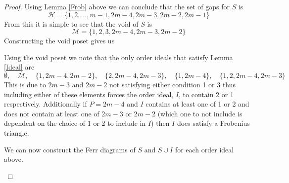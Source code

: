 \documentclass[11pt,letterpaper]{article}
\theoremstyle{definition}
\begin{document}
\begin{proof}
    Using Lemma \ref{Frob} above we can conclude that the set of gaps for $S$ is 
    \[\mathcal{H}=\{1,2,...,m-1,2m-4,2m-3,2m-2,2m-1\}\]
    From this it is simple to see that the void of $S$ is 
    \[\mathcal{M}=\{1,2,3,2m-4,2m-3,2m-2\}\]
    Constructing the void poset gives us 
    \begin{center}
    \end{center}

    Using the void poset we note that the only order ideals that satisfy Lemma \ref{Ideal} are 
    \[\emptyset,\quad \mathcal{M}, \quad \{1,2m-4,2m-2\},\quad \{2,2m-4,2m-3\},\quad \{1,2m-4\},\quad \{1,2,2m-4,2m-3\}\]
    This is due to $2m-3$ and $2m-2$ not satisfying either condition 1 or 3 thus including either of these elements forces the order ideal, $I$, to contain 2 or 1 respectively. Additionally if $P=2m-4$ and $I$ contains at least one of 1 or 2 and does not contain at least one of $2m-3$ or $2m-2$ (which one to not include is dependent on the choice of 1 or 2 to include in $I$) then $I$ does satisfy a Frobenius triangle.

    We can now construct the Ferr diagrams of $S$ and $S\cup I$ for each order ideal above.

    \begin{center}
\end{center}
\end{proof}
\end{document}
